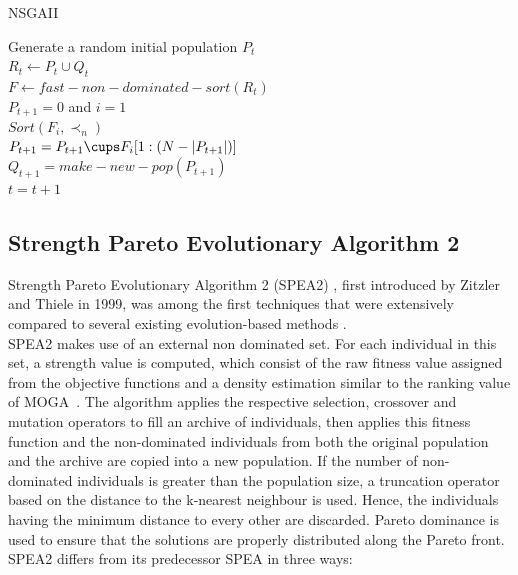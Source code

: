 \begin{algorithm}[H]
\caption{NSGAII}
\label{nsgaii_alg}
\SetAlgoLined
Generate a random initial population $P_t$\\
$R_t \gets P_t \cup Q_t$ \\
$F \gets fast-non-dominated-sort(R_t)$ \\
$P_{t+1} = 0$ and $i = 1$\\
$Sort(F_i, \prec_n)$\\
$P_{t+1} = P_{t+1} \cups F_i[1:(N-|P_{t+1}|)]$\\
$Q_{t+1} = make-new-pop(P_{t+1})$\\
$t = t+1$\\
\end{algorithm}

\subsection{Strength Pareto Evolutionary Algorithm 2}

Strength Pareto Evolutionary Algorithm 2 (SPEA2) \cite{zitzler2001spea2}, first introduced by Zitzler and Thiele in 1999, was among the first techniques that were extensively compared to several existing evolution-based methods \cite{coello2007evolutionary}.\\

SPEA2 makes use of an external non dominated set. For each individual in this set, a strength value is computed, which consist of the raw fitness value assigned from the objective functions and a density estimation similar to the ranking value of MOGA~\cite{fonseca1993genetic}. The algorithm applies the respective selection, crossover and mutation operators to fill an archive of individuals, then applies this fitness function and the non-dominated individuals from both the original population and the archive are copied into a new population. If the number of non-dominated individuals is greater than the population size, a truncation operator based on the distance to the k-nearest neighbour is used. Hence, the individuals having the minimum distance to every other are discarded. Pareto dominance is used to ensure that the solutions are properly distributed along the Pareto front. SPEA2 differs from its predecessor SPEA in three ways: \\ 


